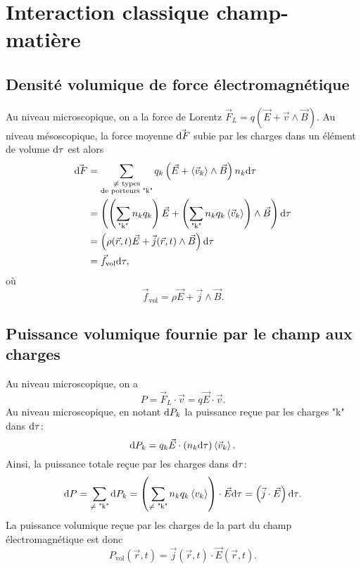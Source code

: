 \section{Interaction classique champ-matière}

\subsection{Densité volumique de force électromagnétique}

Au niveau microscopique, on a la force de Lorentz $\vec{F}_{L}=q\left(\vec{E}+\vec{v}\wedge\vec{B}\right)$. Au niveau mésoscopique, la force moyenne $\vec{\mathrm{d} F}$ subie par les charges dans un élément de volume $\mathrm{d}\tau$ est alors
\begin{align}
    \vec{\mathrm{d} F}
    &=
    \sum_{\substack{\neq\text{ types}\\\text{de porteurs "k"}}}q_k\left(\vec{E}+\left\langle \vec{v}_k\right\rangle\wedge\vec{B}\right)n_k\mathrm{d}\tau\\
    &=
    \left(\left(\sum_{\text{"k"}}n_k q_k\right)\vec{E}+\left(\sum_{\text{"k"}}n_k q_k \left\langle\vec{v}_k\right\rangle\right)\wedge\vec{B}\right)\mathrm{d}\tau\\
    &=
    \left(\rho(\vec{r},t)\vec{E}+\vec{j}(\vec{r},t)\wedge\vec{B}\right)\mathrm{d}\tau\\
    &=
    \vec{f}_{\mathrm{vol}}\mathrm{d}\tau,
\end{align}
où
\begin{equation}
    \boxed{
        \vec{f}_{\mathrm{vol}}=\rho\vec{E}+\vec{j}\wedge\vec{B}.
    }
\end{equation}

\subsection{Puissance volumique fournie par le champ aux charges}

Au niveau microscopique, on a 
\begin{equation}
    P=\vec{F}_L\cdot\vec{v}=q\vec{E}\cdot\vec{v}.
\end{equation}
Au niveau microscopique, en notant $\mathrm{d} P_k$ la puissance reçue par les charges "k" dans $\mathrm{d}\tau$:
\begin{equation}
    \mathrm{d} P_k=
    q_k\vec{E}\cdot\left(n_k\mathrm{d}\tau\right)\left\langle \vec{v}_k\right\rangle.
\end{equation}
Ainsi, la puissance totale reçue par les charges dans $\mathrm{d}\tau$:
\begin{equation}
    \mathrm{d} P
    =
    \sum_{\neq \text{ "k"}}\mathrm{d} P_k
    =
    \left(\sum_{\neq \text{ "k"}}n_k q_k\left\langle v_k\right\rangle\right)\cdot\vec{E}\mathrm{d}\tau=\left(\vec{j}\cdot\vec{E}\right)\mathrm{d}\tau.
\end{equation}
La puissance volumique reçue par les charges de la part du champ électromagnétique est donc
\begin{equation}
    \boxed{
        P_{\mathrm{vol}}(\vec{r},t)=\vec{j}(\vec{r},t)\cdot\vec{E}(\vec{r},t).
    }
\end{equation}

